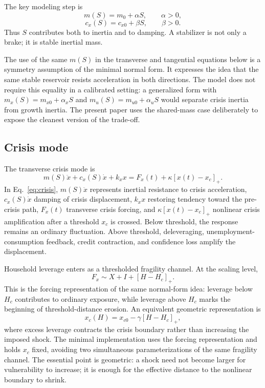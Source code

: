\documentclass[11pt]{article}
\newcommand{\brpos}[1]{\left[#1\right]_+}
\begin{document}
The key modeling step is
\begin{equation}
m(S)=m_0+\alpha S,\qquad \alpha>0,
\label{eq:mS}
\end{equation}
\begin{equation}
c_x(S)=c_{x0}+\beta S,\qquad \beta>0.
\label{eq:cS}
\end{equation}
Thus $S$ contributes both to inertia and to damping. A stabilizer is not only a brake; it is stable inertial mass.

The use of the same $m(S)$ in the transverse and tangential equations below is a symmetry assumption of the minimal normal form. It expresses the idea that the same stable reservoir resists acceleration in both directions. The model does not require this equality in a calibrated setting: a generalized form with $m_x(S)=m_{x0}+\alpha_x S$ and $m_u(S)=m_{u0}+\alpha_u S$ would separate crisis inertia from growth inertia. The present paper uses the shared-mass case deliberately to expose the cleanest version of the trade-off.

\subsection{Crisis mode}
The transverse crisis mode is
\begin{equation}
m(S)\ddot{x}+c_x(S)\dot{x}+k_xx=F_x(t)+\kappa\brpos{x(t)-x_c}.
\label{eq:crisis}
\end{equation}
In Eq.~\eqref{eq:crisis}, $m(S)\ddot{x}$ represents inertial resistance to crisis acceleration, $c_x(S)\dot{x}$ damping of crisis displacement, $k_xx$ restoring tendency toward the pre-crisis path, $F_x(t)$ transverse crisis forcing, and $\kappa\brpos{x(t)-x_c}$ nonlinear crisis amplification after a threshold $x_c$ is crossed. Below threshold, the response remains an ordinary fluctuation. Above threshold, deleveraging, unemployment-consumption feedback, credit contraction, and confidence loss amplify the displacement.

Household leverage enters as a thresholded fragility channel. At the scaling level,
\begin{equation}
F_x\sim X+I+\brpos{H-H_c}.
\label{eq:Fx}
\end{equation}
This is the forcing representation of the same normal-form idea: leverage below $H_c$ contributes to ordinary exposure, while leverage above $H_c$ marks the beginning of threshold-distance erosion. An equivalent geometric representation is
\[
x_c(H)=x_{c0}-\gamma\brpos{H-H_c},
\]
where excess leverage contracts the crisis boundary rather than increasing the imposed shock. The minimal implementation uses the forcing representation and holds $x_c$ fixed, avoiding two simultaneous parameterizations of the same fragility channel. The essential point is geometric: a shock need not become larger for vulnerability to increase; it is enough for the effective distance to the nonlinear boundary to shrink.
\end{document}
